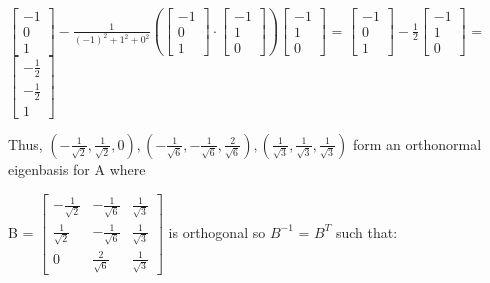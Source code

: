 \begin{tbox}
        \hspace{0.5cm}
        $\begin{bmatrix}
            -1 \\
            0 \\
            1
        \end{bmatrix}
        - \frac{1}{(-1)^2 + 1^2 + 0^2}
        (\begin{bmatrix}
            -1 \\
            0 \\
            1
        \end{bmatrix} \cdot
        \begin{bmatrix}
            -1 \\
            1 \\
            0
        \end{bmatrix})
        \begin{bmatrix}
            -1 \\
            1 \\
            0
        \end{bmatrix}$ =
        $\begin{bmatrix}
            -1 \\
            0 \\
            1
        \end{bmatrix}
        - \frac{1}{2}
        \begin{bmatrix}
            -1 \\
            1 \\
            0
        \end{bmatrix}$ =
        $\begin{bmatrix}
            -\frac{1}{2} \\
            -\frac{1}{2} \\
            1
        \end{bmatrix}$
        \normalsize

        Thus,
        $(-\frac{1}{\sqrt{2}},\frac{1}{\sqrt{2}},0),
        (-\frac{1}{\sqrt{6}},-\frac{1}{\sqrt{6}},\frac{2}{\sqrt{6}}),
        (\frac{1}{\sqrt{3}},\frac{1}{\sqrt{3}},\frac{1}{\sqrt{3}})$
        form an orthonormal eigenbasis for A where

        B =
        \scriptsize
        $\begin{bmatrix}
            -\frac{1}{\sqrt{2}} & -\frac{1}{\sqrt{6}} & \frac{1}{\sqrt{3}} \\
            \frac{1}{\sqrt{2}} & -\frac{1}{\sqrt{6}} & \frac{1}{\sqrt{3}} \\
            0 & \frac{2}{\sqrt{6}} & \frac{1}{\sqrt{3}}
        \end{bmatrix}$
        \normalsize
        is orthogonal so $B^{-1}$ = $B^T$ such that:


\end{tbox}
